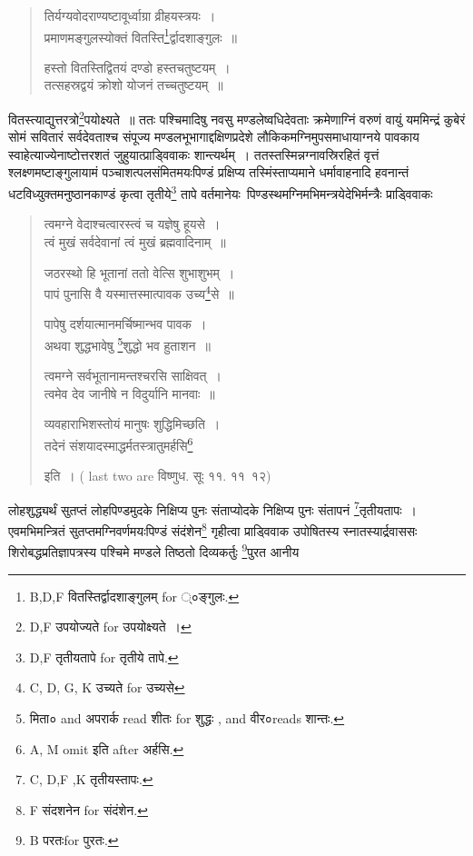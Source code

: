 \documentclass[11pt, openany]{book}
\begin{document}
\begin{quote}
{\vy तिर्यग्यवोदराण्यष्टावूर्ध्वाग्रा व्रीहयस्त्रयः~।\\
प्रमाणमङ्गुलस्योक्तं वितस्ति\renewcommand{\thefootnote}{4}\footnote{B,D,F वितस्तिर्द्वादशाङ्गुलम् for ्०ङ्गुलः.}र्द्वादशाङ्गुलः~॥

हस्तो वितस्तिद्वितयं दण्डो हस्तचतुष्टयम्~।\\
तत्सहस्रद्वयं क्रोशो योजनं तच्चतुष्टयम्~॥}
\end{quote}

वितस्त्याद्युत्तरत्रो\renewcommand{\thefootnote}{5}\footnote{D,F उपयोज्यते for उपयोक्ष्यते~।}पयोक्ष्यते~॥ ततः पश्चिमादिषु नवसु मण्डलेष्वधिदेवताः क्रमेणाग्निं वरुणं वायुं यममिन्द्रं कुबेरं सोमं सवितारं सर्वदेवताश्च संपूज्य मण्डलभूभागाद्दक्षिणप्रदेशे लौकिकमग्निमुपसमाधायाग्नये पावकाय स्वाहेत्याज्येनाष्टोत्तरशतं जुहुयात्प्राड्विवाकः शान्त्यर्थम्~। ततस्तस्मिन्नग्नावस्रिरहितं वृत्तं श्लक्ष्णमष्टाङ्गुलायामं पञ्चाशत्पलसंमितमयःपिण्डं प्रक्षिप्य तस्मिंस्ताप्यमाने धर्मावाहनादि हवनान्तं धटविध्युक्तमनुष्ठानकाण्डं कृत्वा तृतीये\renewcommand{\thefootnote}{6}\footnote{D,F तृतीयतापे for तृतीये तापे.} तापे वर्तमानेयः\textendash\ पिण्डस्थमग्निमभिमन्त्रयेदेभिर्मन्त्रैः प्राड्विवाकः

\newpage

\begin{quote}
{\vy त्वमग्ने वेदाश्चत्वारस्त्वं च यज्ञेषु हूयसे~।\\
त्वं मुखं सर्वदेवानां त्वं मुखं ब्रह्मवादिनाम्~॥

जठरस्थो हि भूतानां ततो वेत्सि शुभाशुभम्~।\\
पापं पुनासि वै यस्मात्तस्मात्पावक उच्य\renewcommand{\thefootnote}{1}\footnote{C, D, G, K उच्यते for उच्यसे}से~॥

पापेषु दर्शयात्मानमर्चिष्मान्भव पावक~।\\
अथवा शुद्धभावेषु \renewcommand{\thefootnote}{2}\footnote{मिता० and अपरार्क read शीतः for शुद्धः , and वीर०reads शान्तः.}शुद्धो भव हुताशन~॥

त्वमग्ने सर्वभूतानामन्तश्चरसि साक्षिवत्~।\\
त्वमेव देव जानीषे न विदुर्यानि मानवाः~॥

व्यवहाराभिशस्तोयं मानुषः शुद्धिमिच्छति~।\\
तदेनं संशयादस्माद्धर्मतस्त्रातुमर्हसि\renewcommand{\thefootnote}{3}\footnote{A, M omit इति after अर्हसि.}} इति~। ( last two are विष्णुध. सूः ११. ११\textendash\ १२)
\end{quote}

लोहशुद्ध्यर्थं सुतप्तं लोहपिण्डमुदके निक्षिप्य पुनः संताप्योदके निक्षिप्य पुनः संतापनं \renewcommand{\thefootnote}{4}\footnote{C, D,F ,K तृतीयस्तापः.}तृतीयतापः~। एवमभिमन्त्रितं सुतप्तमग्निवर्णमयःपिण्डं संदंशेन\renewcommand{\thefootnote}{5}\footnote{F संदशनेन for संदंशेन.} गृहीत्वा प्राड्विवाक उपोषितस्य स्नातस्यार्द्रवाससः शिरोबद्धप्रतिज्ञापत्रस्य पश्चिमे मण्डले तिष्ठतो दिव्यकर्तुः \renewcommand{\thefootnote}{6}\footnote{B परतःfor पुरतः.}पुरत आनीय
\end{document}
